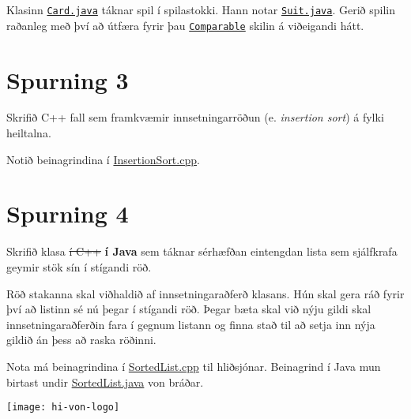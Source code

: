 \documentclass{article}
\begin{document}
Klasinn \href{https://raw.githubusercontent.com/Ernir/kennsluefni/master/T2/Code/w6/Card.java}{\texttt{Card.java}} táknar spil í spilastokki. Hann notar \href{https://raw.githubusercontent.com/Ernir/kennsluefni/master/T2/Code/w6/Suit.java}{\texttt{Suit.java}}.
Gerið spilin raðanleg með því að útfæra fyrir þau \texttt{\href{https://docs.oracle.com/javase/8/docs/api/java/lang/Comparable.html}{Comparable}} skilin á viðeigandi hátt.

\section{Spurning 3}
Skrifið C++ fall sem framkvæmir innsetningarröðun (e. \emph{insertion sort}) á fylki heiltalna.

Notið beinagrindina í  \href{https://raw.githubusercontent.com/Ernir/kennsluefni/master/T2/Code/w6/InsertionSort.cpp}{InsertionSort.cpp}.
\section{Spurning 4}
Skrifið klasa \sout{í C++} \textbf{í Java} sem táknar sérhæfðan eintengdan lista sem sjálfkrafa geymir stök sín í stígandi röð.

Röð stakanna skal viðhaldið af innsetningaraðferð klasans. Hún skal gera ráð fyrir því að listinn sé nú þegar í stígandi röð. Þegar bæta skal við nýju gildi skal innsetningaraðferðin fara í gegnum listann og finna stað til að setja inn nýja gildið án þess að raska röðinni.

Nota má beinagrindina í \href{https://raw.githubusercontent.com/Ernir/kennsluefni/master/T2/Code/w6/SortedList.cpp}{SortedList.cpp} til hliðsjónar. {\color{red} Beinagrind í Java mun birtast undir \href{https://raw.githubusercontent.com/Ernir/kennsluefni/master/T2/Code/w6/SortedList.java}{SortedList.java} von bráðar.}

\vfill
\texttt{[image: hi-von-logo]}
\end{document}
